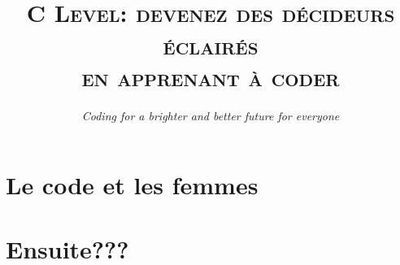 \documentclass[aspectratio=169]{beamer}
\title{\vspace{1.0cm}\\ \textsc{\Large{C Level: devenez des d\'ecideurs  \'eclair\'es\\ en apprenant \`a coder}}}
\subtitle{\vspace{2.0cm} \textcolor{isvblue}{\textit{Coding for a brighter and better future for everyone}}}
\date{}
\begin{document}
	\frame{\titlepage}



	\section{Le code et les femmes}
        

	\section{Ensuite???}
\end{document}
